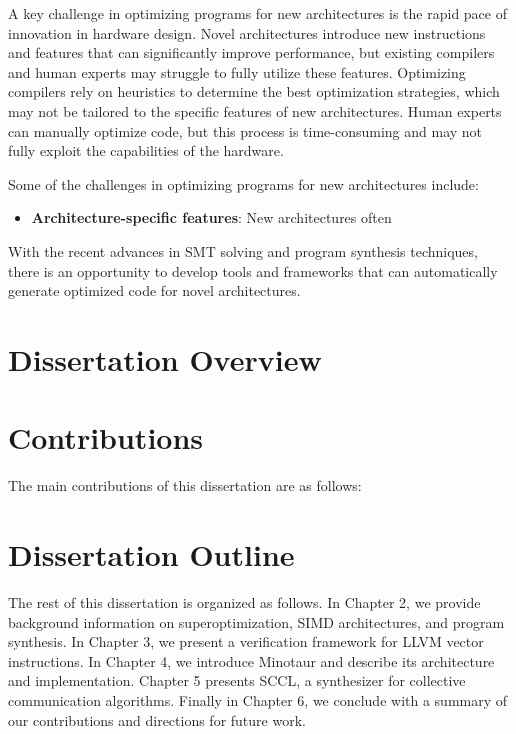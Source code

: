A key challenge in optimizing programs for new architectures is the
rapid pace of innovation in hardware design. Novel architectures
introduce new instructions and features that can significantly improve
performance, but existing compilers and human experts may
struggle to fully utilize these features. Optimizing compilers rely on
heuristics to determine the best optimization strategies, which may not
be tailored to the specific features of new architectures. Human
experts can manually optimize code, but this process is time-consuming
and may not fully exploit the capabilities of the hardware.






Some of the challenges in optimizing programs for new architectures
include:

\begin{itemize}
\item \textbf{Architecture-specific features}: New architectures often
\end{itemize}


With the recent advances in SMT solving and program synthesis
techniques, there is an opportunity to develop tools and frameworks
that can automatically generate optimized code for novel
architectures.


\section{Dissertation Overview}



\section{Contributions}

The main contributions of this dissertation are as follows:

\section{Dissertation Outline}

The rest of this dissertation is organized as follows. In Chapter 2, we
provide background information on superoptimization, SIMD architectures,
and program synthesis. In Chapter 3, we present a verification framework
for LLVM vector instructions. In Chapter 4, we introduce Minotaur and
describe its architecture and implementation. Chapter 5 presents SCCL,
a synthesizer for collective communication algorithms. Finally in Chapter
6, we conclude with a summary of our contributions and directions for
future work.






